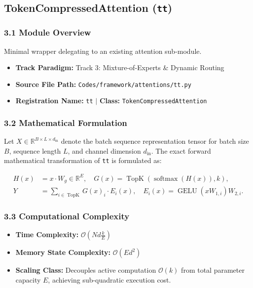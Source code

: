 \subsection{TokenCompressedAttention (\texttt{tt})}
\label{sec:app_module_tt}

\subsubsection*{3.1 Module Overview}
Minimal wrapper delegating to an existing attention sub-module.
\begin{itemize}
    \item \textbf{Track Paradigm:} Track 3: Mixture-of-Experts \& Dynamic Routing
    \item \textbf{Source File Path:} \texttt{Codes/framework/attentions/tt.py}
    \item \textbf{Registration Name:} \texttt{tt} $\mid$ \textbf{Class:} \texttt{TokenCompressedAttention}
\end{itemize}

\subsubsection*{3.2 Mathematical Formulation}
Let $X \in \mathbb{R}^{B \times L \times d_{\text{in}}}$ denote the batch sequence representation tensor for batch size $B$, sequence length $L$, and channel dimension $d_{\text{in}}$. The exact forward mathematical transformation of \texttt{tt} is formulated as:

\begin{align}
H(x) &= x \cdot W_g \in \mathbb{R}^{E}, \quad G(x) = \operatorname{TopK}\left(\operatorname{softmax}(H(x)), k\right), \\
Y &= \sum_{i \in \operatorname{TopK}} G(x)_i \cdot E_i(x), \quad E_i(x) = \operatorname{GELU}(x W_{1, i}) W_{2, i}.
\end{align}


\subsubsection*{3.3 Computational Complexity}
\begin{itemize}
    \item \textbf{Time Complexity:} $\mathcal{O}(N d \frac{k}{E})$
    \item \textbf{Memory State Complexity:} $\mathcal{O}(E d^2)$
    \item \textbf{Scaling Class:} Decouples active computation $\mathcal{O}(k)$ from total parameter capacity $E$, achieving sub-quadratic execution cost.
\end{itemize}

